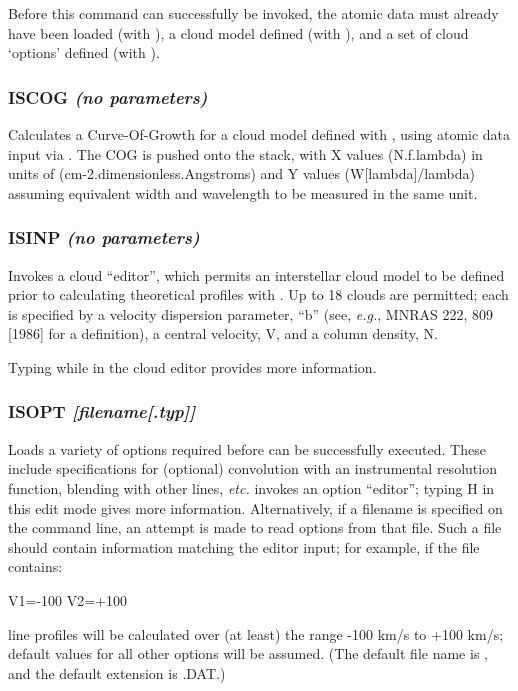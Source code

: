 \documentclass[twoside,11pt,noabs,nolof]{starlink}
\providecommand{\dipcom}[3]{\subsubsection*{\label{COM:#1}\xlabel{COM:#1}\textbf{#1} \emph{#2}}}
\begin{document}
Before this command can successfully be invoked, the atomic data must
already have been loaded (with ),  a cloud model defined (with
),  and a set of cloud `options' defined (with ).

\dipcom{ISCOG}{(no parameters)}{Calculates a Curve-Of-Growth for an interstellar cloud model}
Calculates a Curve-Of-Growth for a cloud model defined with ,
using atomic data input via .  The COG is pushed onto the stack,
with X values (N.f.lambda) in units of (cm-2.dimensionless.Angstroms)
and Y values (W[lambda]/lambda) assuming equivalent width and
wavelength to be measured in the same unit.

\dipcom{ISINP}{(no parameters)}{Sets up an interstellar cloud model}
Invokes a cloud ``editor'', which permits an interstellar cloud model
to be defined prior to calculating theoretical profiles with .
Up to 18 clouds are permitted; each is specified by a velocity
dispersion parameter, ``b'' (see, \emph{e.g.}, MNRAS 222, 809 [1986]
for a definition), a central velocity, V, and a column density, N.

Typing   while in the cloud editor provides more information.

\dipcom{ISOPT}{[filename[.typ]]}{Sets up options required by {\texttt{ISCALC}}}
Loads a variety of options required before   can be successfully
executed. These include specifications for (optional) convolution with
an instrumental resolution function, blending with other lines, \emph{etc.}   invokes an option ``editor''; typing H in this edit mode
gives more information. Alternatively, if a filename is specified on
the command line, an attempt is made to read options from that file.
Such a file should contain information matching the   editor
input; for example, if the file contains:

\begin{terminalv}
V1=-100
V2=+100
\end{terminalv}

line profiles will be calculated over (at least) the range -100 km/s
to +100 km/s; default values for all other options will be assumed.
(The default file name is ,  and the default extension is .DAT.)
\end{document}
